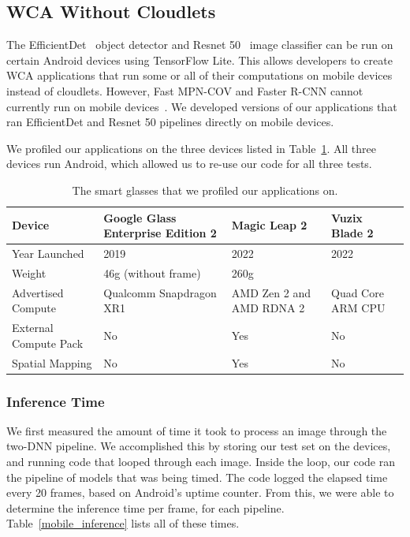 \subsection{WCA Without Cloudlets}

The EfficientDet~\cite{Tan2020} object detector and Resnet 50~\cite{He2016}
image classifier can be run on certain Android devices using TensorFlow Lite.
This allows developers to create WCA applications that run some or all of their
computations on mobile devices instead of cloudlets.
However, Fast MPN-COV and Faster R-CNN cannot currently run on mobile
devices~\cite{tflite, torchscript}.
We developed versions of our applications that ran EfficientDet and Resnet 50
pipelines directly on mobile devices.

We profiled our applications on the three devices listed in
Table~\ref{tab:devices}.
All three devices run Android, which allowed us to re-use our code for all three
tests.

\begin{table}
\begin{tabular}{|l||p{4cm}|p{3cm}|p{3.5cm}|}
  \hline
  Device & Google Glass Enterprise Edition 2 & Magic Leap 2 & Vuzix Blade 2\\
  \hline
  \hline
  Year Launched & 2019 & 2022 & 2022\\
  Weight & 46g (without frame) & 260g & \\
  Advertised Compute & Qualcomm Snapdragon XR1 & AMD Zen 2 and AMD RDNA 2 & Quad Core ARM CPU\\
  External Compute Pack & No & Yes & No\\
  Spatial Mapping & No & Yes & No\\
  \hline
\end{tabular}
  \caption{
    The smart glasses that we profiled our applications on.
  }\label{tab:devices}
\end{table}

\subsubsection{Inference Time}

We first measured the amount of time it took to process an image through the
two-DNN pipeline.
We accomplished this by storing our test set on the devices, and running code
that looped through each image.
Inside the loop, our code ran the pipeline of models that was being timed.
The code logged the elapsed time every 20 frames, based on Android's uptime
counter.
From this, we were able to determine the inference time per frame, for each
pipeline.
Table~\ref{mobile_inference} lists all of these times.

